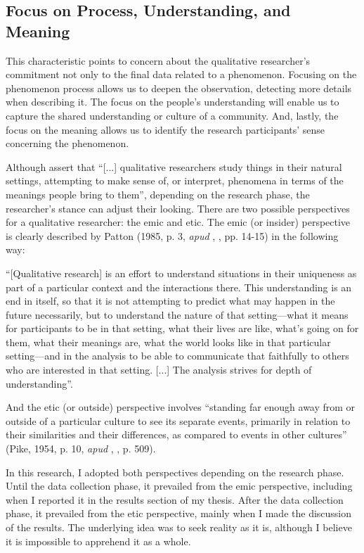 \subsection{Focus on Process, Understanding, and Meaning}
\label{res-met-ss:meaning}

This characteristic points to concern about the qualitative researcher's commitment not only to the final data related to a phenomenon. Focusing on the phenomenon process allows us to deepen the observation, detecting more details when describing it. The focus on the people's understanding will enable us to capture the shared understanding or culture of a community. And, lastly, the focus on the meaning allows us to identify the research participants' sense concerning the phenomenon. 

Although  assert that “[...] qualitative researchers study things in their natural settings, attempting to make sense of, or interpret, phenomena in terms of the meanings people bring to them”, depending on the research phase, the researcher’s stance can adjust their looking. There are two possible perspectives for a qualitative researcher: the emic and etic. The emic (or insider) perspective is clearly described by Patton (1985, p. 3, \textit{apud} \citeauthor{merriam:2016-whatIs}, \citeyear{merriam:2016-whatIs}, pp. 14-15) in the following way:
\begin{citacao}
    “[Qualitative research] is an effort to understand situations in their uniqueness as part of a particular context and the interactions there. This understanding is an end in itself, so that it is not attempting to predict what may happen in the future necessarily, but to understand the nature of that setting—what it means for participants to be in that setting, what their lives are like, what’s going on for them, what their meanings are, what the world looks like in that particular setting—and in the analysis to be able to communicate that faithfully to others who are interested in that setting. [...] The analysis strives for depth of understanding”.
\end{citacao}
And the etic (or outside) perspective involves “standing far enough away from or outside of a particular culture to see its separate events, primarily in relation to their similarities and their differences, as compared to events in other cultures” (Pike, 1954, p. 10, \textit{apud} \citeauthor{patton:2015}, \citeyear{patton:2015}, p. 509). 

In this research, I adopted both perspectives depending on the research phase. Until the data collection phase, it prevailed from the emic perspective, including when I reported it in the results section of my thesis. After the data collection phase, it prevailed from the etic perspective, mainly when I made the discussion of the results. The underlying idea was to seek reality as it is, although I believe it is impossible to apprehend it as a whole.

